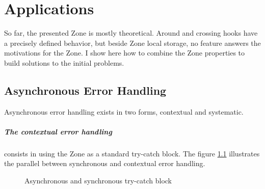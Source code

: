 
\chapter{Applications}
\label{ch:apps}


So far, the presented Zone is mostly theoretical. Around and crossing hooks have a precisely defined behavior, but beside Zone local storage, no feature answers the motivations for the Zone. I show here how to combine the Zone properties to build solutions to the initial problems.

\section{Asynchronous Error Handling}

Asynchronous error handling exists in two forms, contextual and systematic.

\paragraph{The contextual error handling} consists in using the Zone as a standard try-catch block. The figure \ref{fig:sas-tc} illustrates the parallel between synchronous and contextual error handling.
\begin{figure}[H]
\centering
{}
\caption{Asynchronous and synchronous try-catch block}
\label{fig:sas-tc}
\end{figure}

